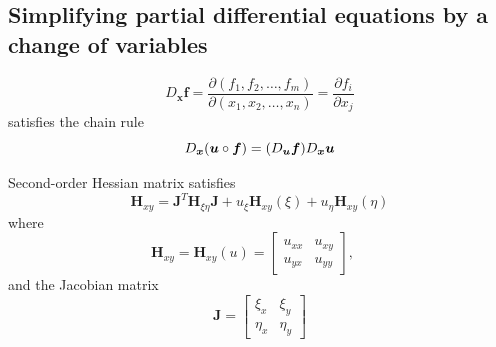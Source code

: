 \documentclass[a4]{overview}
\begin{document}
\subsection{Simplifying partial differential equations by a change of variables}

\begin{lemma}
	\label{lem:Frechet_derivative}
	\[
	D_{\boldsymbol{x}} \boldsymbol{f} = \frac{\partial (f_1, f_2, \ldots, f_m)}{\partial (x_1, x_2, \ldots, x_n)}
		= \frac{\partial f_i}{\partial x_j}
	\] 
	satisfies the chain rule
	\[
		D_{\boldsymbol{x}} (\boldsymbol{u} \circ \boldsymbol{f}) = 
		(D_{\boldsymbol{u}} \boldsymbol{f}) D_{\boldsymbol{x}} \boldsymbol{u}
	\] 
\end{lemma}

\begin{theorem}
	\label{thm:order2_Hessian_matrix}
	Second-order Hessian matrix satisfies
	\[
		\boldsymbol{H}_{xy} = \boldsymbol{J}^T \boldsymbol{H}_{\xi\eta} \boldsymbol{J}
		+ u_{\xi} \boldsymbol{H}_{xy}(\xi) + u_{\eta} \boldsymbol{H}_{xy}(\eta)
	\] 
	where
	\[
		\boldsymbol{H}_{xy} = \boldsymbol{H}_{xy}(u) = \begin{bmatrix} u_{xx} & u_{xy}\\ u_{yx} & u_{yy} \end{bmatrix},\quad
	\]
	and the Jacobian matrix
	\[
		\boldsymbol{J} = \begin{bmatrix} \xi_x & \xi_y\\ \eta_x & \eta_y \end{bmatrix}
	\] 
	
\end{theorem}
\end{document}

